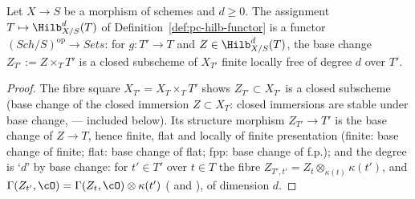 \begin{lemma}\label{lem:pc-hilb-functorial}
Let $X\to S$ be a morphism of schemes and $d\ge0$.  The assignment
$T\mapsto\Hilb^d_{X/S}(T)$ of
Definition~\ref{def:pc-hilb-functor} is
a functor $(\mathit{Sch}/S)^{\mathrm{op}}\to\textit{Sets}$: for
$g:T'\to T$ and $Z\in\Hilb^d_{X/S}(T)$, the base change
$Z_{T'}:=Z\times_TT'$ is a closed subscheme of $X_{T'}$ finite locally
free of degree $d$ over $T'$.
\end{lemma}
\begin{proof}
The fibre square $X_{T'}=X_T\times_TT'$ shows $Z_{T'}\subset X_{T'}$ is
a closed subscheme (base change of the closed immersion
$Z\subset X_T$: closed immersions are stable under base change,
 — included below).  Its structure
morphism $Z_{T'}\to T'$ is the base change of $Z\to T$, hence finite,
flat and locally of finite presentation (finite: base change of finite;
flat: base change of flat; fpp: base change of f.p.); and the degree is
‘$d$’ by base change: for $t'\in T'$ over $t\in T$ the fibre
$Z_{T',t'}=Z_t\otimes_{\kappa(t)}\kappa(t')$, and
$\Gamma(Z_{t'},\cO)=\Gamma(Z_t,\cO)\otimes\kappa(t')$
( and
), of dimension $d$.
\end{proof}

